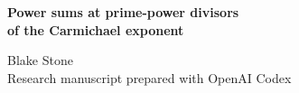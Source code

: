 \documentclass[11pt,letterpaper]{article}
\begin{document}
\thispagestyle{plain}
\begin{center}
{\LARGE\bfseries Power sums at prime-power divisors\\ of the Carmichael exponent\par}
\vspace{0.5em}
Blake Stone\\
{\small Research manuscript prepared with OpenAI Codex}
\end{center}

\begin{abstract}
Fix a prime \(\ell\) and an integer \(r\ge1\). Among \(N\) for which \(\ell^r\mid\lambda(N)\), we characterize those satisfying \(\sum_{k=1}^{N-1}k^{\lambda(N)/\ell^r}\equiv0\pmod N\) and give an asymptotic count with a positive explicit leading constant. For \((\ell,r)=(2,1)\) the classification and a finer expansion were already proved by Grau, Moree and Oller-Marcén.
\end{abstract}
\end{document}
